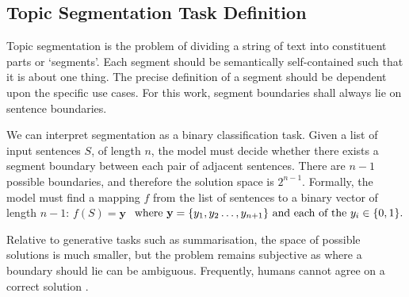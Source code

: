
\subsection{Topic Segmentation Task Definition}
Topic segmentation is the problem of dividing a string of text into constituent parts or ‘segments’. Each segment should be semantically self-contained such that it is about one thing. The precise definition of a segment should be dependent upon the specific use cases. For this work, segment boundaries shall always lie on sentence boundaries.

We can interpret segmentation as a binary classification task.  Given a list of input sentences $S$, of length $n$, the model must decide whether there exists a segment boundary between each pair of adjacent sentences. There are $n-1$ possible boundaries, and therefore the solution space is $2^{n-1}$.  Formally, the model must find a mapping $f$ from the list of sentences to a binary vector of length $n-1$:
\(
     f(S) = \textbf{y} 
\)
\( \textnormal{ where } \textbf{y}=\{y_1,y_2\ldots,y_{n+1}\} \textnormal{ and each of the } y_i\in\{0,1\}.
\)

Relative to generative tasks such as summarisation, the space of possible solutions is much smaller, but the problem remains subjective as where a boundary should lie can be ambiguous. Frequently, humans cannot agree on a correct solution \cite{TextTiling}.



 
